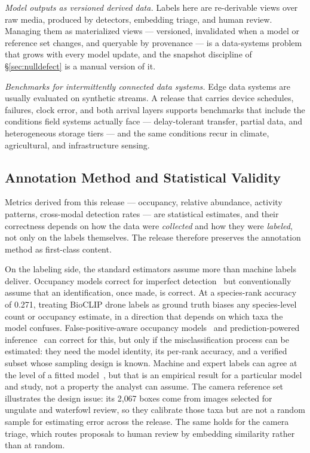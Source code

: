 \documentclass[sigconf]{acmart}
\begin{document}
\emph{Model outputs as versioned derived data.} Labels here are
re-derivable views over raw media, produced by detectors, embedding
triage, and human review. Managing them as materialized views ---
versioned, invalidated when a model or reference set changes, and
queryable by provenance --- is a data-systems problem that grows with
every model update, and the snapshot discipline of
\S\ref{sec:nulldefect} is a manual version of it.

\emph{Benchmarks for intermittently connected data systems.} Edge data
systems are usually evaluated on synthetic streams. A release that
carries device schedules, failures, clock error, and both arrival
layers supports benchmarks that include the conditions field systems
actually face --- delay-tolerant transfer, partial data, and
heterogeneous storage tiers --- and the same conditions recur in
climate, agricultural, and infrastructure sensing.

\subsection{Annotation Method and Statistical Validity}
\label{sec:validity}

Metrics derived from this release --- occupancy, relative abundance,
activity patterns, cross-modal detection rates --- are statistical
estimates, and their correctness depends on how the data were
\emph{collected} and how they were \emph{labeled}, not only on the
labels themselves. The release therefore preserves the annotation
method as first-class content.

On the labeling side, the standard estimators assume more than machine
labels deliver. Occupancy models correct for imperfect
detection~\cite{mackenzie2002occupancy} but conventionally assume that
an identification, once made, is correct. At a species-rank accuracy of
0.271, treating BioCLIP drone labels as ground truth biases
any species-level count or occupancy estimate, in a direction that
depends on which taxa the model confuses. False-positive-aware occupancy
models~\cite{royle2006falsepositive,chambert2015falsepositive} and
prediction-powered inference~\cite{angelopoulos2023ppi} can correct
for this, but only if the misclassification process can be estimated:
they need the model identity, its per-rank accuracy, and a verified
subset whose sampling design is known. Machine and expert labels can
agree at the level of a fitted model~\cite{Thornton2026AI}, but that is
an empirical result for a particular model and study, not a property
the analyst can assume. The camera reference set illustrates the design
issue: its 2{,}067 boxes come from images selected for ungulate and
waterfowl review, so they calibrate those taxa but are not a random
sample for estimating error across the release. The same holds for the
camera triage, which routes proposals to human review by embedding
similarity rather than at random.
\end{document}
